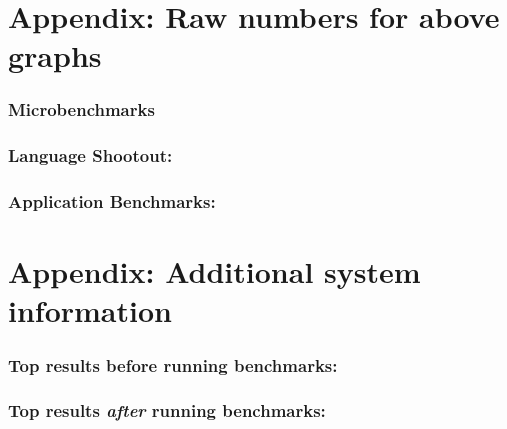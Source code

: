 \documentclass{article}
\begin{document}





\appendix
\section{Appendix: Raw numbers for above graphs}

\subsubsection*{Microbenchmarks}
{\footnotesize

}

\subsubsection*{Language Shootout:}
{\footnotesize
}

\subsubsection*{Application Benchmarks:}
{\footnotesize
}

\section{Appendix: Additional system information}

\subsubsection*{Top results before running benchmarks:}
{
\footnotesize

}
\subsubsection*{Top results {\em after} running benchmarks:}
{
\footnotesize

}
\end{document}
